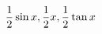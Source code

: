 \documentclass[preview]{standalone}
\begin{document}
\begin{align*}
\special{dvisvgm:raw <g id='unique000'>}\frac12\sin x,\frac12 x,\frac12\tan x\special{dvisvgm:raw </g>}
\end{align*}
\end{document}
